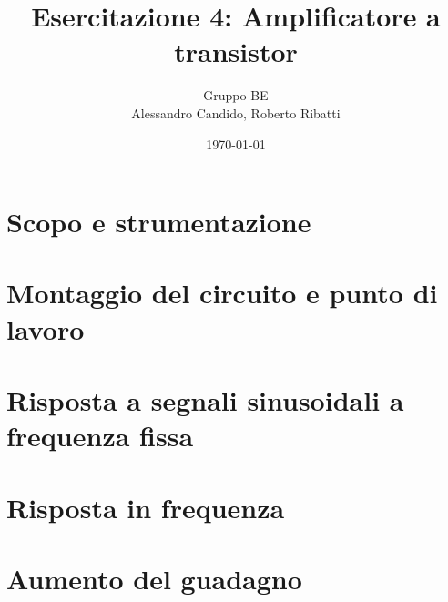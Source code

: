 \documentclass[10pt,a4paper]{article}
\title{Esercitazione 4: Amplificatore a transistor}
\author{Gruppo BE \\ Alessandro Candido, Roberto Ribatti}
\date{\today}
\begin{document}
\maketitle

\section{Scopo e strumentazione}

\section{Montaggio del circuito e punto di lavoro}

\section{Risposta a segnali sinusoidali a frequenza fissa}

\section{Risposta in frequenza}

\section{Aumento del guadagno}
\end{document}
